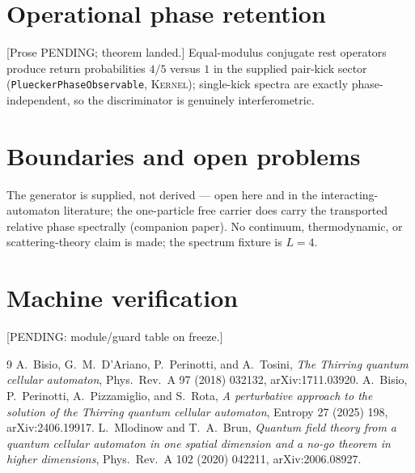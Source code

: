 \documentclass[11pt]{article}
\newcommand{\Kernel}{\textcolor{kernelcolor}{\textsc{Kernel}}}
\begin{document}
\section{Operational phase retention}
[Prose PENDING; theorem landed.]  Equal-modulus conjugate rest operators
produce return probabilities $4/5$ versus $1$ in the supplied pair-kick
sector (\texttt{PlueckerPhaseObservable}, \Kernel{}); single-kick
spectra are exactly phase-independent, so the discriminator is genuinely
interferometric.

\section{Boundaries and open problems}
The generator is supplied, not derived --- open here and in the
interacting-automaton literature; the one-particle free carrier does
carry the transported relative phase spectrally (companion paper).
No continuum, thermodynamic, or scattering-theory claim is made; the
spectrum fixture is $L=4$.

\appendix
\section{Machine verification}
[PENDING: module/guard table on freeze.]

\begin{thebibliography}{9}
A.~Bisio, G.~M.~D'Ariano, P.~Perinotti, and A.~Tosini,
\emph{The Thirring quantum cellular automaton},
Phys.\ Rev.\ A 97 (2018) 032132, arXiv:1711.03920.
A.~Bisio, P.~Perinotti, A.~Pizzamiglio, and S.~Rota,
\emph{A perturbative approach to the solution of the Thirring quantum
cellular automaton}, Entropy 27 (2025) 198, arXiv:2406.19917.
L.~Mlodinow and T.~A.~Brun,
\emph{Quantum field theory from a quantum cellular automaton in one
spatial dimension and a no-go theorem in higher dimensions},
Phys.\ Rev.\ A 102 (2020) 042211, arXiv:2006.08927.
\end{thebibliography}
\end{document}
